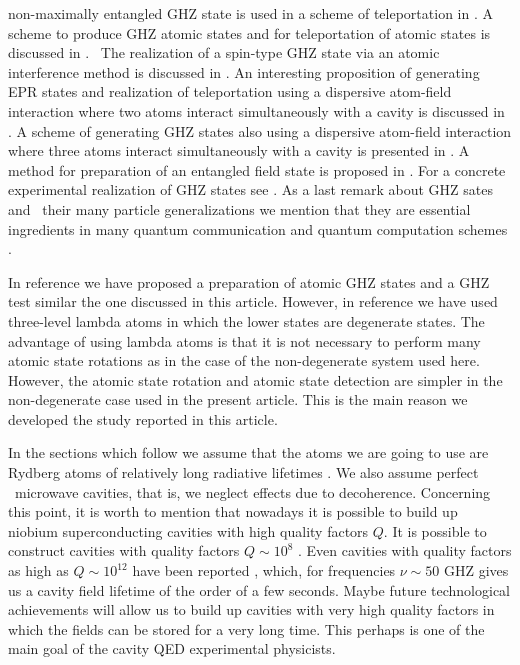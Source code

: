 \documentclass[12pt,thmsa]{article}
\begin{document}
non-maximally entangled GHZ state is used in a scheme of teleportation in 
\cite{DaiChenLi}. A scheme to produce GHZ atomic states and for
teleportation of atomic states is discussed in \cite{YeGuo2}. \ The
realization of a spin-type GHZ state via an atomic interference method is
discussed in \cite{SongGuo}. An interesting proposition of generating EPR
states and realization of teleportation using a dispersive atom-field
interaction where two atoms interact simultaneously with a cavity is
discussed in \cite{ZengGuo}. A scheme of generating GHZ states also using a
dispersive atom-field interaction where three atoms interact simultaneously
with a cavity is presented in \cite{Zeng2}. A method for preparation of an
entangled field state is proposed in \cite{IkramZhuZubairy}. For a concrete
experimental realization of GHZ states see \cite{EXPGHZ, RevHaroche}. As a
last remark about GHZ sates and \ their many particle generalizations we
mention that they are essential ingredients in many quantum communication
and quantum computation schemes \cite{Zeilinger, EXPGHZ, MPGHZ}.

In reference \cite{GHZLambdaat} we have proposed a preparation of atomic GHZ
states and a GHZ test similar the one discussed in this article. However, in
reference \cite{GHZLambdaat} we have used three-level lambda atoms in which
the lower states are degenerate states. The advantage of using lambda atoms
is that it is not necessary to perform many atomic state rotations as in the
case of the non-degenerate system used here. However, the atomic state
rotation and atomic state detection are simpler in the non-degenerate case
used in the present article. This is the main reason we developed the study
reported in this article.

In the sections which follow we assume that the atoms we are going to use
are Rydberg atoms of relatively long radiative lifetimes \cite{Rydat}. We
also assume perfect \ microwave cavities, that is, we neglect effects due to
decoherence. Concerning this point, it is worth to mention that nowadays it
is possible to build up niobium superconducting cavities with high quality
factors $Q$. It is possible to construct cavities with quality factors $%
Q\sim 10^{8}$ \cite{haroche}. Even cavities with quality factors as high as $%
Q\sim 10^{12}$ have been reported \cite{walther}, which, for frequencies $%
\nu \sim 50$ GHZ gives us a cavity field lifetime of the order of a few
seconds. Maybe future technological achievements will allow us to build up
cavities with very high quality factors in which the fields can be stored
for a very long time. This perhaps is one of the main goal of the cavity QED
experimental physicists.
\end{document}

